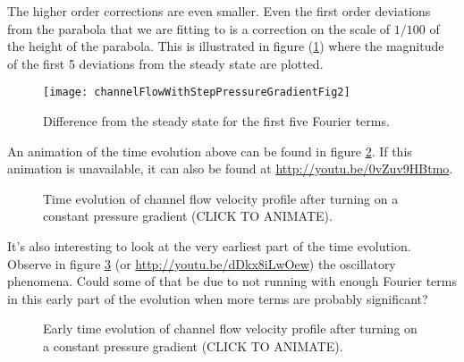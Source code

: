 The higher order corrections are even smaller.  Even the first order deviations from the parabola that we are fitting to is a correction on the scale of $1/100$ of the height of the parabola.  This is illustrated in figure (\ref{fig:channelFlowWithStepPressureGradient:channelFlowWithStepPressureGradientFig2}) where the magnitude of the first 5 deviations from the steady state are plotted.

\begin{figure}[htp]
   \centering
   \texttt{[image: channelFlowWithStepPressureGradientFig2]}
   \caption{Difference from the steady state for the first five Fourier terms.}
   \label{fig:channelFlowWithStepPressureGradient:channelFlowWithStepPressureGradientFig2}
\end{figure}

An animation of the time evolution above can be found in figure \ref{fig:channelFlowWithStepPressureGradient:channelFlowWithStepPressureGradientFig3}.  If this animation is unavailable, it can also be found at \href{http://youtu.be/0vZuv9HBtmo}{http://youtu.be/0vZuv9HBtmo}.

\begin{figure}[htp]
   \centering
{}
   \caption{Time evolution of channel flow velocity profile after turning on a constant pressure gradient (CLICK TO ANIMATE).}
   \label{fig:channelFlowWithStepPressureGradient:channelFlowWithStepPressureGradientFig3}
\end{figure}

It's also interesting to look at the very earliest part of the time evolution.  Observe in figure \ref{fig:channelFlowWithStepPressureGradient:channelFlowWithStepPressureGradientFig4} (or \href{http://youtu.be/dDkx8iLwOew}{http://youtu.be/dDkx8iLwOew}) the oscillatory phenomena.  Could some of that be due to not running with enough Fourier terms in this early part of the evolution when more terms are probably significant?

\begin{figure}[htp]
   \centering
{}
   \caption{Early time evolution of channel flow velocity profile after turning on a constant pressure gradient (CLICK TO ANIMATE).}
   \label{fig:channelFlowWithStepPressureGradient:channelFlowWithStepPressureGradientFig4}
\end{figure}

\EndArticle
